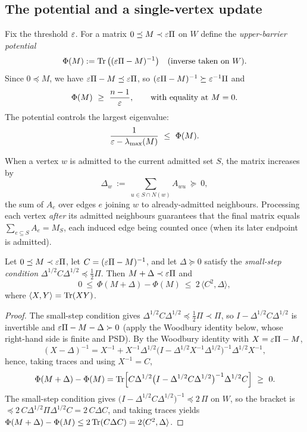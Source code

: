 \subsection{The potential and a single-vertex update}

Fix the threshold $\varepsilon$. For a matrix $0\preceq M\prec\varepsilon\Pi$ on $W$ define the
\emph{upper-barrier potential}
\[
\Phi(M):=\operatorname{Tr}\big((\varepsilon\Pi-M)^{-1}\big)\quad(\text{inverse taken on }W).
\]
Since $0\preceq M$, we have $\varepsilon\Pi-M\preceq\varepsilon\Pi$, so $(\varepsilon\Pi-M)^{-1}\succeq\varepsilon^{-1}\Pi$ and
\begin{equation}\label{eq:phi0}
\Phi(M)\ \ge\ \frac{n-1}{\varepsilon},\qquad\text{with equality at } M=0 .
\end{equation}
The potential controls the largest eigenvalue:
\begin{equation}\label{eq:phicap}
\frac{1}{\varepsilon-\operatorname*{\lambda_{\max}}(M)}\ \le\ \Phi(M).
\end{equation}

When a vertex $w$ is admitted to the current admitted set $S$, the matrix increases by
\begin{equation}\label{eq:delta}
\Delta_w\ :=\ \sum_{u\in S\cap N(w)}A_{wu}\ \succeq\ 0 ,
\end{equation}
the sum of $A_e$ over edges $e$ joining $w$ to already-admitted neighbours. Processing each vertex
\emph{after} its admitted neighbours guarantees that the final matrix equals $\sum_{e\subseteq S}A_e=M_S$,
each induced edge being counted once (when its later endpoint is admitted).

\begin{lemma}\label{lem:woodbury}
Let $0\preceq M\prec\varepsilon\Pi$, let $C=(\varepsilon\Pi-M)^{-1}$, and let $\Delta\succeq 0$ satisfy the
\emph{small-step condition} $\Delta^{1/2}C\Delta^{1/2}\preceq\tfrac12\Pi$. Then $M+\Delta\prec\varepsilon\Pi$ and
\begin{equation}\label{eq:incr}
0\ \le\ \Phi(M+\Delta)-\Phi(M)\ \le\ 2\,\big\langle C^2,\Delta\big\rangle ,
\end{equation}
where $\langle X,Y\rangle=\operatorname{Tr}(XY)$.
\end{lemma}
\begin{proof}
The small-step condition gives $\Delta^{1/2}C\Delta^{1/2}\preceq\tfrac12\Pi\prec\Pi$, so
$I-\Delta^{1/2}C\Delta^{1/2}$ is invertible and $\varepsilon\Pi-M-\Delta\succ 0$ (apply the
Woodbury identity below, whose right-hand side is finite and PSD). By the Woodbury identity with
$X=\varepsilon\Pi-M$,
\[
(X-\Delta)^{-1}=X^{-1}+X^{-1}\Delta^{1/2}\big(I-\Delta^{1/2}X^{-1}\Delta^{1/2}\big)^{-1}\Delta^{1/2}X^{-1},
\]
hence, taking traces and using $X^{-1}=C$,
\[
\Phi(M+\Delta)-\Phi(M)=\Tr\!\Big[C\Delta^{1/2}\big(I-\Delta^{1/2}C\Delta^{1/2}\big)^{-1}\Delta^{1/2}C\Big]\ \ge\ 0 .
\]
The small-step condition gives $\big(I-\Delta^{1/2}C\Delta^{1/2}\big)^{-1}\preceq 2\,\Pi$ on $W$, so
the bracket is $\preceq 2\,C\Delta^{1/2}\Pi\Delta^{1/2}C=2\,C\Delta C$, and taking traces yields
$\Phi(M+\Delta)-\Phi(M)\le 2\operatorname{Tr}(C\Delta C)=2\langle C^2,\Delta\rangle$.
\end{proof}

